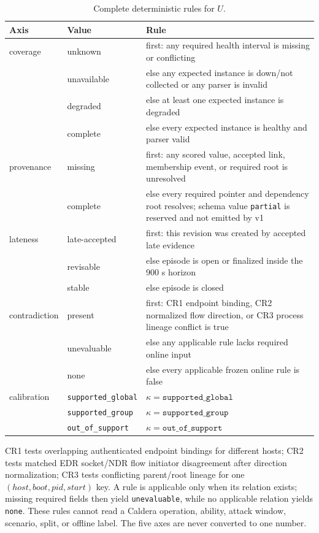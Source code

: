 \begin{table}[t]
\caption{Complete deterministic rules for $U$.}
\label{tab:u-registry}
\centering
\scriptsize
\begin{tabular}{p{}p{}p{}}
\toprule
\textbf{Axis} & \textbf{Value} & \textbf{Rule} \\
\midrule
coverage & unknown & first: any required health interval is missing or conflicting \\
 & unavailable & else any expected instance is down/not collected or any parser is invalid \\
 & degraded & else at least one expected instance is degraded \\
 & complete & else every expected instance is healthy and parser valid \\
\midrule
provenance & missing & first: any scored value, accepted link, membership event, or required root is unresolved \\
 & complete & else every required pointer and dependency root resolves; schema value \texttt{partial} is reserved and not emitted by v1 \\
\midrule
lateness & late-accepted & first: this revision was created by accepted late evidence \\
 & revisable & else episode is open or finalized inside the 900 s horizon \\
 & stable & else episode is closed \\
\midrule
contradiction & present & first: CR1 endpoint binding, CR2 normalized flow direction, or CR3 process lineage conflict is true \\
 & unevaluable & else any applicable rule lacks required online input \\
 & none & else every applicable frozen online rule is false \\
\midrule
calibration & \texttt{supported\_global} & $\kappa=\texttt{supported\_global}$ \\
 & \texttt{supported\_group} & $\kappa=\texttt{supported\_group}$ \\
 & \texttt{out\_of\_support} & $\kappa=\texttt{out\_of\_support}$ \\
\bottomrule
\end{tabular}
\end{table}

CR1 tests overlapping authenticated endpoint bindings for different hosts; CR2 tests matched
EDR socket/NDR flow initiator disagreement after direction normalization; CR3 tests conflicting
parent/root lineage for one $(host,boot,pid,start)$ key. A rule is applicable only when its
relation exists; missing required fields then yield \texttt{unevaluable}, while no applicable
relation yields \texttt{none}. These rules cannot read a Caldera operation, ability, attack
window, scenario, split, or offline label. The five axes are never converted to one number.

